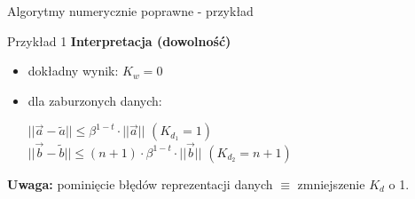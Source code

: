 \begin{frame}[fragile]{Algorytmy numerycznie poprawne - przykład}
	\begin{exampleblock}{Przykład 1}
    	{\bf Interpretacja (dowolność)}
        \begin{itemize}
        	\item dokładny wynik: $K_w = 0$
            \item dla zaburzonych danych:
            	\begin{addmargin}[1cm]{0cm}
            		$|| \vec{a} - \tilde{a} || \le \beta^{1-t} \cdot || \vec{a} ||$ \hspace{.5cm} $(K_{d_1} = 1)$\\
            		$|| \vec{b} - \tilde{b} || \le (n + 1) \cdot \beta^{1-t} \cdot || \vec{b} ||$ \hspace{.5cm} $(K_{d_2} = n+1)$
            	\end{addmargin}
        \end{itemize}
        {\bf Uwaga:} pominięcie błędów reprezentacji danych $\equiv$ zmniejszenie $K_d$ o 1.
	\end{exampleblock}
\end{frame}
